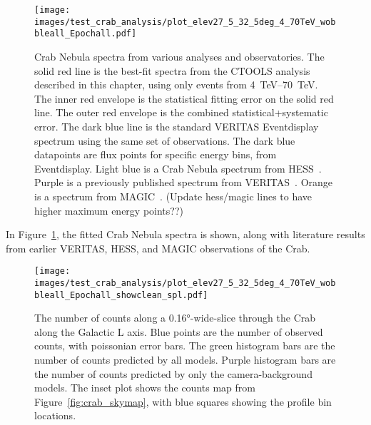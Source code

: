     
  \begin{figure}[h]
    \centering
    \texttt{[image: images/test\_crab\_analysis/plot\_elev27\_5\_32\_5deg\_4\_70TeV\_wobbleall\_Epochall.pdf]}
    \caption[Crab Test Spectrum]
    {
      Crab Nebula spectra from various analyses and observatories.
      The solid red line is the best-fit spectra from the CTOOLS analysis described in this chapter, using only events from \SIrange{4}{70}{TeV}.
      The inner red envelope is the statistical fitting error on the solid red line.
      The outer red envelope is the combined statistical+systematic error.
      The dark blue line is the standard VERITAS Eventdisplay spectrum using the same set of observations.
      The dark blue datapoints are flux points for specific energy bins, from Eventdisplay.
      Light blue is a Crab Nebula spectrum from HESS~\cite{hess2006crab}.
      Purple is a previously published spectrum from VERITAS~\cite{veritas2015crab}.
      Orange is a spectrum from MAGIC~\cite{magic2015crab}.
      {\color{red}(Update hess/magic lines to have higher maximum energy points??)}
    }
    \label{fig:crab_test_spectra}
  \end{figure}
    
  In Figure~\ref{fig:crab_test_spectra}, the fitted Crab Nebula spectra is shown, along with literature results from earlier VERITAS, HESS, and MAGIC observations of the Crab.
  
  \begin{figure}[h]
    \centering
    \texttt{[image: images/test\_crab\_analysis/plot\_elev27\_5\_32\_5deg\_4\_70TeV\_wobbleall\_Epochall\_showclean\_spl.pdf]}
    \caption[Crab Profile along Galactic L]
    {
      The number of counts along a \ang{0.16}-wide-slice through the Crab along the Galactic L axis.
      Blue points are the number of observed counts, with poissonian error bars.
      The green histogram bars are the number of counts predicted by all models.
      Purple histogram bars are the number of counts predicted by only the camera-background models.
      The inset plot shows the counts map from Figure~\ref{fig:crab_skymap}, with blue squares showing the profile bin locations.
    }
    \label{fig:crab_profile_l}
  \end{figure}

